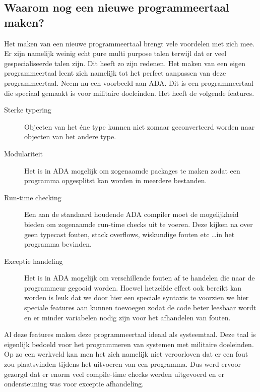 \documentclass[11pt,a4paper]{article}
\begin{document}
\subsection{Waarom nog een nieuwe programmeertaal maken?}
Het maken van een nieuwe programmeertaal brengt vele voordelen met zich mee. Er zijn namelijk weinig echt pure multi purpose talen terwijl dat er veel gespecialiseerde talen zijn. Dit heeft zo zijn redenen. Het maken van een eigen programmeertaal leent zich namelijk tot het perfect aanpassen van deze programmeertaal. Neem nu een voorbeeld aan ADA. Dit is een programmeertaal die speciaal gemaakt is voor militaire doeleinden. Het heeft de volgende features.

\begin{description}
\item[Sterke typering] Objecten van het éne type kunnen niet zomaar geconverteerd worden naar objecten van het andere type.
\item[Modulariteit] Het is in ADA mogelijk om zogenaamde packages te maken zodat een programma opgesplitst kan worden in meerdere bestanden.
\item[Run-time checking] Een aan de standaard houdende ADA compiler moet de mogelijkheid bieden om zogenaamde run-time checks uit te voeren. Deze kijken na over geen typecast fouten, stack overflows, wiskundige fouten etc \ldots in het programma bevinden.
\item[Exceptie handeling] Het is in ADA mogelijk om verschillende fouten af te handelen die naar de programmeur gegooid worden. Hoewel hetzelfde effect ook bereikt kan worden is leuk dat we door hier een speciale syntaxis te voorzien we hier speciale features aan kunnen toevoegen zodat de code beter leesbaar wordt en er minder variabelen nodig zijn voor het afhandelen van fouten.
\end{description}

Al deze features maken deze programmeertaal ideaal als systeemtaal. Deze taal is eigenlijk bedoeld voor het programmeren van systemen met militaire doeleinden. Op zo een werkveld kan men het zich namelijk niet veroorloven dat er een fout zou plaatsvinden tijdens het uitvoeren van een programma. Dus werd ervoor gezorgd dat er enorm veel compile-time checks werden uitgevoerd en er ondersteuning was voor exceptie afhandeling.
\end{document}
